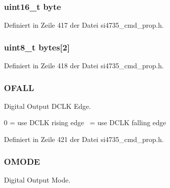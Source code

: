 \subsubsection[{byte}]{\setlength{\rightskip}{0pt plus 5cm}uint16\+\_\+t byte}\label{uniondout__format_ab0549c1b5ea980a02e7eab77e21fea49}


Definiert in Zeile 417 der Datei si4735\+\_\+cmd\+\_\+prop.\+h.

\hypertarget{uniondout__format_a46e4c05d20a047ec169f60d3167e912e}{}
\subsubsection[{bytes}]{\setlength{\rightskip}{0pt plus 5cm}uint8\+\_\+t bytes\mbox{[}2\mbox{]}}\label{uniondout__format_a46e4c05d20a047ec169f60d3167e912e}


Definiert in Zeile 418 der Datei si4735\+\_\+cmd\+\_\+prop.\+h.

\hypertarget{uniondout__format_a8c5f2c1b3351eb9150cc41a003cff4df}{}
\subsubsection[{O\+F\+A\+L\+L}]{\setlength{\rightskip}{0pt plus 5cm}O\+F\+A\+L\+L}\label{uniondout__format_a8c5f2c1b3351eb9150cc41a003cff4df}


Digital Output D\+C\+L\+K Edge. 

0 = use D\+C\+L\+K rising edge~ = use D\+C\+L\+K falling edge 

Definiert in Zeile 421 der Datei si4735\+\_\+cmd\+\_\+prop.\+h.

\hypertarget{uniondout__format_a4d995054bef39e68df20343ec82ae5b9}{}
\subsubsection[{O\+M\+O\+D\+E}]{\setlength{\rightskip}{0pt plus 5cm}O\+M\+O\+D\+E}\label{uniondout__format_a4d995054bef39e68df20343ec82ae5b9}


Digital Output Mode. 

